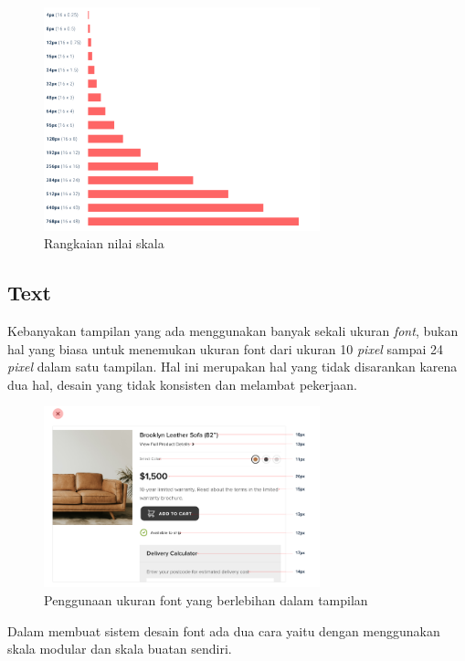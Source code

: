 \begin{figure}[H]
	\centering
	\includegraphics[keepaspectratio, width=8cm]{gambar/refactoring-ui-g5.png}
	\caption{Rangkaian nilai skala \citep{refactoringui}}
	\label{gambar:refactoring-ui-g5.png}
\end{figure}

\subsection{Text}
Kebanyakan tampilan yang ada menggunakan banyak sekali ukuran \textit{font}, bukan hal yang biasa untuk menemukan ukuran font dari ukuran 10 \textit{pixel} sampai 24 \textit{pixel} dalam satu tampilan. Hal ini merupakan hal yang tidak disarankan karena dua hal, desain yang tidak konsisten dan melambat pekerjaan.
\\
\begin{figure}[H]
	\centering
	\includegraphics[keepaspectratio, width=8cm]{gambar/g100.png}
	\caption{Penggunaan ukuran font yang berlebihan dalam tampilan \citep{refactoringui}}
	\label{gambar:g100.png}
\end{figure}

Dalam membuat sistem desain font ada dua cara yaitu dengan menggunakan skala modular dan skala buatan sendiri.

